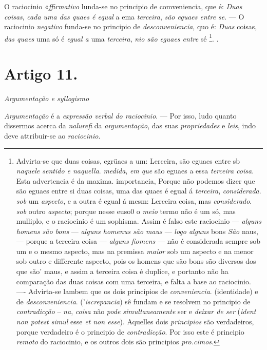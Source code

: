  
O raciocinio «\emph{ffirmativo} lunda-se no principio de comveniencia, que é: \emph{Duas coisas}, \emph{cada uma das quaes é equal} a ema \emph{terceira}, \emph{são eguaes entre se}. --- O raciocinio \emph{negativo} funda-se no principio de \emph{desconveniencia}, quo é: \emph{Duas} coisas, \emph{das quaes} uma só é \emph{egual a} uma \emph{terceira}, \emph{nio são eguaes entre} sé \footnote{Advirta-se que duas coisas, egrüaes a um: Lerceira, são eguaes entre sb \emph{naquele sentido e naquella}. \emph{medida}, \emph{em que} são eguaes a essa \emph{terceira coisa}. Esta advertencia é da maxima. importancia, Porque não podemos dizer que são eguaes entre si duas coisas, uma das quaes é egual á \emph{terceira}, \emph{considerada}. \emph{sob} um \emph{aspecto}, e a outra é egual á mesm: Lerceira coisa, mas \emph{considerado}. \emph{sob} outro \emph{aspecto}; porque nesse euso0 o \emph{meio} termo não é um só, mas mulliplo, e o raciocinio é um sophisma. Assim é falso este raciocinio --- \emph{alguns homens são bons} --- \emph{alguns homenus são maus} --- \emph{logo alguns} bons \emph{São} naus, --- porque a terceira coisa --- \emph{alguns fiomens} --- não é considerada sempre sob um e o mesmo aspecto, mas na premissa \emph{maior} sob um aspecto e na menor sob outro e differente aspecto, pois os homens que são bons são diversos dos que são' maus, e assim a terceira coisa é duplice, e portanto não ha comparação das duas coisas com uma terceira, e falta a base ao raciocinio. ---- Advirta-se lambem que os dois principios de \emph{conveniencia}. (identidade) e de \emph{desconveniencia}. ('\emph{iscrepancia}) sê fundam e se resolvem no principio de \emph{contradicção} -- \emph{na}, \emph{coisa} não \emph{pode simultaneamente} ser e \emph{deixar de ser} (\emph{ident non potest simul} esse \emph{et non esse}). Aquelles dois \emph{principios} são verdadeiros, porque verdadeiro é o principio de \emph{contradicção}. Por isso este é principio \emph{remoto} do raciocinio, e os outros dois são principios \emph{pro.cimos}.}. .


\section*{Artigo 11.}

\emph{Argumentação e syllogismo}


\emph{Argumentação} é a \emph{expressão verbal do raciocinio}. --- Por isso, ludo quanto dissermos acerca da \emph{nalurefi} da \emph{argumentação}, das suas \emph{propriedades} e \emph{leis}, indo deve attribuir-se ao \emph{raciocinio}.

